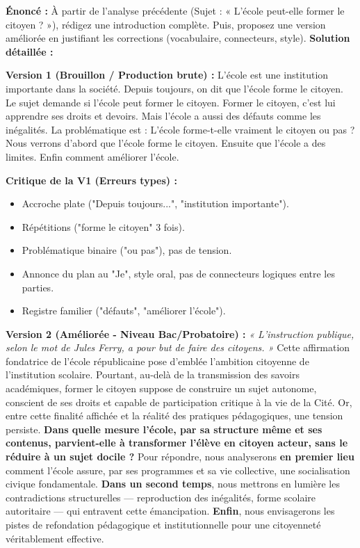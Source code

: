 \documentclass[11pt]{article}
\newcommand{\cle}[1]{{\popxbold\color{popdark}#1}}
\begin{document}
\begin{exoresolu}
    \textbf{Énoncé :} À partir de l'analyse précédente (Sujet : « L'école peut-elle former le citoyen ? »), rédigez une introduction complète. Puis, proposez une version améliorée en justifiant les corrections (vocabulaire, connecteurs, style).
    \tcblower
    \textbf{Solution détaillée :}
    
    \textbf{Version 1 (Brouillon / Production brute) :}
    L'école est une institution importante dans la société. Depuis toujours, on dit que l'école forme le citoyen. Le sujet demande si l'école peut former le citoyen. Former le citoyen, c'est lui apprendre ses droits et devoirs. Mais l'école a aussi des défauts comme les inégalités. La problématique est : L'école forme-t-elle vraiment le citoyen ou pas ? Nous verrons d'abord que l'école forme le citoyen. Ensuite que l'école a des limites. Enfin comment améliorer l'école.
    
    \textbf{Critique de la V1 (Erreurs types) :} 
    \begin{itemize}
        \item Accroche plate ("Depuis toujours...", "institution importante").
        \item Répétitions ("forme le citoyen" 3 fois).
        \item Problématique binaire ("ou pas"), pas de tension.
        \item Annonce du plan au "Je", style oral, pas de connecteurs logiques entre les parties.
        \item Registre familier ("défauts", "améliorer l'école").
    \end{itemize}
    
    \textbf{Version 2 (Améliorée - Niveau Bac/Probatoire) :}
    \emph{« L'instruction publique, selon le mot de Jules Ferry, a pour but de faire des citoyens. »} Cette affirmation fondatrice de l'école républicaine pose d'emblée l'ambition citoyenne de l'institution scolaire. Pourtant, au-delà de la transmission des savoirs académiques, \cle{former le citoyen} suppose de construire un sujet autonome, conscient de ses droits et capable de participation critique à la vie de la Cité. \cle{Or}, entre cette finalité affichée et la réalité des pratiques pédagogiques, une tension persiste. \textbf{Dans quelle mesure l'école, par sa structure même et ses contenus, parvient-elle à transformer l'élève en citoyen acteur, sans le réduire à un sujet docile ?} Pour répondre, nous analyserons \textbf{en premier lieu} comment l'école assure, par ses programmes et sa vie collective, une socialisation civique fondamentale. \textbf{Dans un second temps}, nous mettrons en lumière les contradictions structurelles — reproduction des inégalités, forme scolaire autoritaire — qui entravent cette émancipation. \textbf{Enfin}, nous envisagerons les pistes de refondation pédagogique et institutionnelle pour une citoyenneté véritablement effective.
    

\end{exoresolu}
\end{document}
